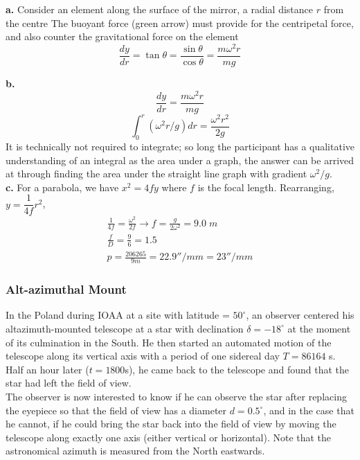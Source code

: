 \documentclass[a4paper,12pt]{extarticle}
\begin{document}
\begin{sol}
\textbf{a.} Consider an element along the surface of the mirror, a radial distance $r$ from the centre
The buoyant force (green arrow) must provide for the centripetal force, and also counter the gravitational force on the element
$$\frac{dy}{dr}=\tan \theta=\frac{\sin\theta}{\cos\theta}=\frac{m\omega^2 r}{mg}$$

\textbf{b.} 
$$\frac{dy}{dr}=\frac{m\omega^2 r}{mg}$$
$$\int_0^r (\omega^2r/g)dr= \frac{\omega^2 r^2}{2g}$$
It is technically not required to integrate; so long the participant has a qualitative understanding of an integral as the area under a graph, the
answer can be arrived at through finding the area under the straight line graph with gradient $\omega^2/g$.\\

\textbf{c.} For a parabola, we have $x^2=4fy$ where $f$ is the focal length. Rearranging, $y=\dfrac{1}{4f}r^2$,
\begin{gather*}
	\frac{1}{4f}=\frac{\omega^2}{2f}\rightarrow f=\frac{g}{2\omega^2}=9.0\; m\\
	\frac{f}{D}=\frac{9}{6}=1.5\\
	p=\frac{206265}{9m}=22.9''/mm=23''/mm
\end{gather*}
\end{sol}

\subsubsection{Alt-azimuthal Mount}
In the Poland during IOAA at a site with latitude = $50^\circ$, an observer centered his altazimuth-mounted telescope at a star with declination $\delta = -18^\circ$ at the moment of its culmination in the South. He then started an automated motion of the telescope along its vertical axis with a period of one sidereal day $T= 86 164$ s. Half an hour later ($t = 1800$s), he came back to the telescope and found that the star had left the field of view.\\

The observer is now interested to know if he can observe the star after replacing the eyepiece so that the field of view has a diameter $d= 0.5^\circ$, and in the case that he cannot, if he could bring the star back into the field of view by moving the telescope along exactly one axis (either vertical or horizontal). Note that the astronomical azimuth is measured from the North eastwards.
\end{document}
